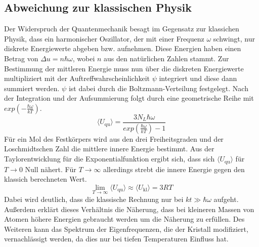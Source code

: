 \subsection{Abweichung zur klassischen Physik}
Der Widerspruch der Quantenmechanik besagt im Gegensatz zur klassichen Physik, dass ein harmonischer Oszillator, der mit einer Frequenz $\omega$ schwingt, nur diskrete Energiewerte abgeben bzw. aufnehmen.
Diese Energien haben einen Betrag von $\Delta u = n \hbar \omega$, wobei $n$ aus den natürlichen Zahlen stammt.
Zur Bestimmung der mittleren Energie muss nun über die diskreten Energiewerte multipliziert mit der Auftreffwahrscheinlichkeit $\psi$ integriert und diese dann summiert werden.
$\psi$ ist dabei durch die Boltzmann-Verteilung festgelegt.
Nach der Integration und der Aufsummierung folgt durch eine geometrische Reihe mit $exp \left (-\frac{\hbar \omega}{kT} \right )$.
\begin{equation}
    \langle U_\text{qu} \rangle = \frac{3 N_L \hbar \omega}{exp \left (\frac{\hbar \omega}{kT} \right ) -1}
\end{equation}
Für ein Mol des Festkörpers wird aus den drei Freiheitsgraden und der Loschmidtschen Zahl die mittlere innere Energie bestimmt.
Aus der Taylorentwicklung für die Exponentialfunktion ergibt sich, dass sich $\langle U_\text{qu} \rangle$ für $T \rightarrow 0$ Null nähert.
Für $T \rightarrow \infty$ allerdings strebt die innere Energie gegen den klassich berechneten Wert.
\begin{equation}
    \lim_{T\to\infty} \langle U_\text{qu} \rangle \approx \langle U_\text{kl} \rangle = 3RT
\end{equation}
Dabei wird deutlich, dass die klassische Rechnung nur bei $kt \gg \hbar \omega$ aufgeht.
Außerdem erklärt dieses Verhältnis die Näherung, dass bei kleineren Massen von Atomen höhere Energien gebraucht werden um die Näherung zu erfüllen.
Des Weiteren kann das Spektrum der Eigenfrequenzen, die der Kristall modifiziert, vernachlässigt werden, da dies nur bei tiefen Temperaturen Einfluss hat.